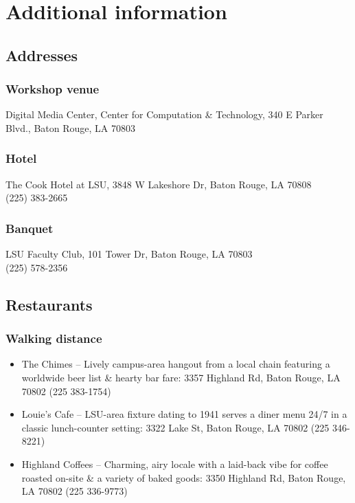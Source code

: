 \documentclass[12pt,letterpaper]{book}
\begin{document}
%
%
%

\chapter{Additional information}

\section{Addresses}

\subsection*{Workshop venue}
Digital Media Center, Center for Computation \& Technology, 340 E Parker Blvd., Baton Rouge, LA 70803
\subsection*{Hotel}
The Cook Hotel at LSU, 3848 W Lakeshore Dr, Baton Rouge, LA 70808 \\
(225) 383-2665
\subsection*{Banquet}
LSU Faculty Club, 101 Tower Dr, Baton Rouge, LA 70803 \\
(225) 578-2356

\section{Restaurants}

\subsection*{Walking distance}

\begin{itemize}
\item The Chimes -- Lively campus-area hangout from a local chain featuring a worldwide beer list \& hearty bar fare: 3357 Highland Rd, Baton Rouge, LA 70802 (225 383-1754)
\item Louie's Cafe -- LSU-area fixture dating to 1941 serves a diner menu 24/7 in a classic lunch-counter setting: 3322 Lake St, Baton Rouge, LA 70802 (225 346-8221)
\item Highland Coffees -- Charming, airy locale with a laid-back vibe for coffee roasted on-site \& a variety of baked goods: 3350 Highland Rd, Baton Rouge, LA 70802 (225 336-9773)
\end{itemize}
\end{document}
